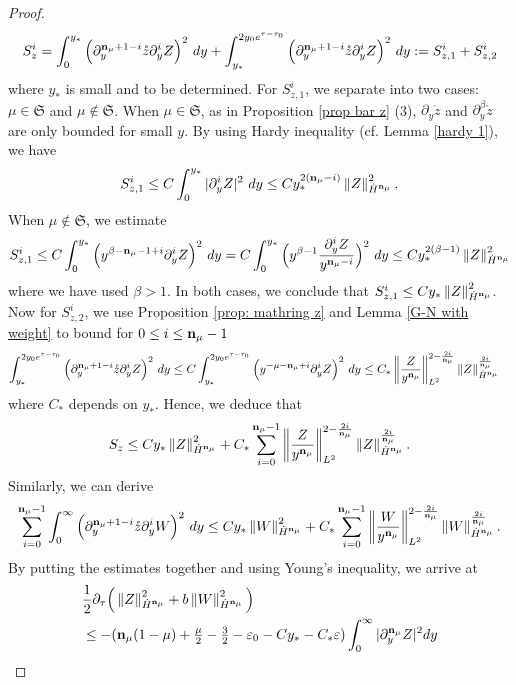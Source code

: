 \documentclass{article}
\newcommand{\norm}[1]{\left\lVert#1\right\rVert}
\newcommand{\pa}{\partial}
\newcommand\eps{\varepsilon}
\def\be{\begin{equation}}
\def\ee{\end{equation}}
\def\beqa{\begin{equation}\begin{aligned}}
\def\eeqa{\end{aligned}\end{equation}}
\def\espz{Z}
\def\espw{W}
\def\ssmu{\mathfrak S}
\def\ndmu{{\bf{n}_{\mu}}}
\numberwithin{equation}{section}
\begin{document}
\begin{proof}
 \begin{align*}
 	S_z^i = \int_0^{y_*} \Big( \pa_y^{\ndmu+1-i} \mathring z \pa_y^i \espz\Big)^2 \ dy 
	+  \int_{y_*}^{2y_0e^{\tau-\tau_0}} \Big( \pa_y^{\ndmu+1-i} \mathring z \pa_y^i \espz\Big)^2 \ dy := S_{z,1}^i+S_{z,2}^i 
 \end{align*}
 where $y_*$ is small and to be determined. 
For $S_{z,1}^i$, we separate into two cases: $\mu\in \ssmu$ and $\mu\notin \ssmu$. 
When $\mu\in\ssmu$, as in Proposition  \ref{prop bar z} (3), $\pa_y \mathring z$ and $\pa_y^{ \beta } \mathring z $ are only bounded for small $y$. By using Hardy inequality (cf. Lemma \ref{hardy 1}), we have 
 \be\label{Sz1}
 	S_{z,1}^i \le  C \int_0^{y_*} | \pa_y^i \espz|^2 \ dy \le C  y_\ast^{2(\ndmu-i)}  \norm{\espz}_{\dot H^{\ndmu}}^2.
 \ee
 When $\mu\notin \ssmu$, we estimate 
\be\label{Sz1-2}
 	S_{z,1}^i \leq C\int_0^{y_*} \Big( y^{\beta - \ndmu -1 +i}\pa_y^i \espz\Big)^2 \ dy = C\int_0^{y_*} \Big( y^{\beta -1}\frac{\pa_y^i \espz}{y^{\ndmu-i}}\Big)^2 \ dy \leq C y_\ast^{2(\beta-1)}  \norm{\espz}_{\dot H^{\ndmu}}^2
 \ee
 where we have used $\beta>1 $. In both cases, we conclude that $ S_{z,1}^i \le  C y_* \norm{\espz}_{\dot H^{\ndmu}}^2$. 
Now for $S_{z,2}^i$, we use Proposition \ref{prop: mathring z} and  Lemma \ref{G-N with weight} 
to bound for $0\le i\le \ndmu-1$
 \beqa\label{Sz3}
 	 \int_{y_*}^{2y_0e^{\tau-\tau_0}} \Big( \pa_y^{\ndmu+1-i} \mathring z \pa_y^i \espz\Big)^2 \ dy &\leq C \int_{y_*}^{2y_0e^{\tau-\tau_0}} \Big( y^{-\mu-\ndmu+i}\pa_y^i \espz\Big)^2 \ dy \le C_* \norm{\frac{\espz}{y^\ndmu}}_{L^2}^{2- \frac{2i}{\ndmu}} \norm{\espz}_{\dot H^{\ndmu}}^{\frac{2i}{\ndmu}} 
 \eeqa
 where $C_*$ depends on $y_*$.  
Hence, we deduce that 
 \be\label{Sz}
 	S_z  \leq C y_*   \norm{\espz}_{\dot H^{\ndmu}}^2 + C_* \sum_{i=0}^{\ndmu-1} \norm{\frac{\espz}{y^\ndmu}}_{L^2}^{2- \frac{2 i}{\ndmu}} \norm{\espz}_{\dot H^{\ndmu}}^{\frac{2i}{\ndmu}}. 
\ee
Similarly, we can derive 
  \be\label{Sw}
 	\sum_{i=0}^{\ndmu-1}  \int_0^\infty\Big(  \pa_y^{\ndmu+1-i} \mathring z \pa_y^i \espw\Big)^2 \ dy \leq  C y_*   \norm{\espw}_{\dot H^{\ndmu}}^2 + C_* \sum_{i=0}^{\ndmu-1}  \norm{\frac{\espw}{y^\ndmu}}_{L^2}^{2- \frac{2 i}{\ndmu}} \norm{\espw}_{\dot H^{\ndmu}}^{\frac{2i}{\ndmu}}. 
 \ee
By putting the estimates together and using Young's inequality, we arrive at  
 \begin{align*}
 	&\frac12\pa_\tau \Big( \norm{\espz}_{\dot H^{\ndmu}}^2+ b \norm{\espw}_{\dot H^{\ndmu}}^2 \Big)\\
	&\le - (\ndmu (1-\mu) + \tfrac{\mu}{2} - \tfrac32 -\eps_0 - C y_* - C_*\eps ) \int_0^\infty |\pa_y^\ndmu \espz|^2 dy 

\end{align*}
\end{proof}
\end{document}
